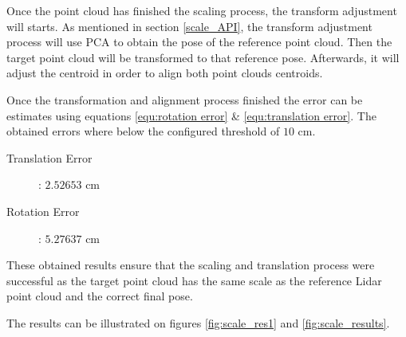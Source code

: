 \documentclass[12pt]{report}
\begin{document}
Once the point cloud has finished the scaling process, the transform adjustment will starts. 
As mentioned in section \ref{scale_API}, the transform adjustment process will use PCA to obtain the pose of the reference point cloud. Then the target point cloud will be transformed to that reference pose.
Afterwards, it will adjust the centroid in order to align both point clouds centroids.

Once the transformation and alignment process finished the error can be estimates using equations \ref{equ:rotation error} \& \ref{equ:translation error}.
The obtained errors where below the configured threshold of $10$ cm.
\begin{description}
  \item[Translation Error]: $2.52653$ cm
  \item[Rotation Error]: $5.27637$ cm 
\end{description}

These obtained results ensure that the scaling and translation process were successful as the target point cloud has the same scale as the reference Lidar point cloud and the correct final pose.

The results can be illustrated on figures \ref{fig:scale_res1} and \ref{fig:scale_results}.
\end{document}
